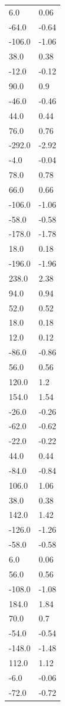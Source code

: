 \begin{longtable}{ll}
6.0 & 0.06 \\
-64.0 & -0.64 \\
-106.0 & -1.06 \\
38.0 & 0.38 \\
-12.0 & -0.12 \\
90.0 & 0.9 \\
-46.0 & -0.46 \\
44.0 & 0.44 \\
76.0 & 0.76 \\
-292.0 & -2.92 \\
-4.0 & -0.04 \\
78.0 & 0.78 \\
66.0 & 0.66 \\
-106.0 & -1.06 \\
-58.0 & -0.58 \\
-178.0 & -1.78 \\
18.0 & 0.18 \\
-196.0 & -1.96 \\
238.0 & 2.38 \\
94.0 & 0.94 \\
52.0 & 0.52 \\
18.0 & 0.18 \\
12.0 & 0.12 \\
-86.0 & -0.86 \\
56.0 & 0.56 \\
120.0 & 1.2 \\
154.0 & 1.54 \\
-26.0 & -0.26 \\
-62.0 & -0.62 \\
-22.0 & -0.22 \\
44.0 & 0.44 \\
-84.0 & -0.84 \\
106.0 & 1.06 \\
38.0 & 0.38 \\
142.0 & 1.42 \\
-126.0 & -1.26 \\
-58.0 & -0.58 \\
6.0 & 0.06 \\
56.0 & 0.56 \\
-108.0 & -1.08 \\
184.0 & 1.84 \\
70.0 & 0.7 \\
-54.0 & -0.54 \\
-148.0 & -1.48 \\
112.0 & 1.12 \\
-6.0 & -0.06 \\
-72.0 & -0.72 \\

\end{longtable}
